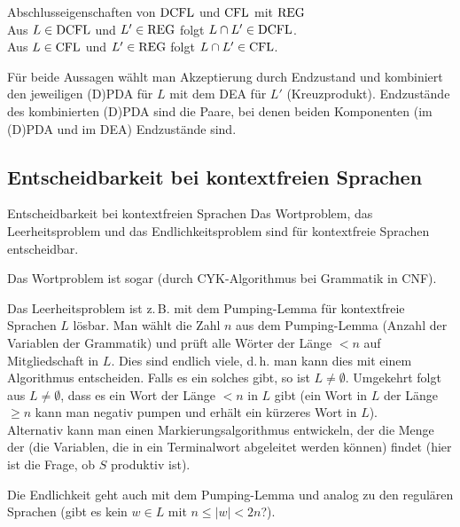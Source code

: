 \linie

\begin{Satz}{Abschlusseigenschaften von $\text{DCFL}$ und $\text{CFL}$ mit $\text{REG}$}\\
    Aus $L \in \text{DCFL}$ und $L' \in \text{REG}$ folgt $L \cap L' \in \text{DCFL}$.\\
    Aus $L \in \text{CFL}$ und $L' \in \text{REG}$ folgt $L \cap L' \in \text{CFL}$.
\end{Satz}

\begin{Beweis}
    Für beide Aussagen wählt man Akzeptierung durch Endzustand und kombiniert
    den jeweiligen (D)PDA für $L$ mit dem DEA für $L'$ (Kreuzprodukt).
    Endzustände des kombinierten (D)PDA sind die Paare, bei denen beiden
    Komponenten (im (D)PDA und im DEA) Endzustände sind.
\end{Beweis}

\pagebreak

\subsection{%
    Entscheidbarkeit bei kontextfreien Sprachen%
}

\begin{Satz}{Entscheidbarkeit bei kontextfreien Sprachen}
    Das Wortproblem, das Leerheitsproblem und das Endlichkeitsproblem sind
    für kontextfreie Sprachen entscheidbar.
\end{Satz}

\begin{Beweis}
    Das Wortproblem ist sogar 
    (durch CYK-Algorithmus bei Grammatik in CNF).

    Das Leerheitsproblem ist z.\,B. mit dem Pumping-Lemma für kontextfreie
    Sprachen $L$ lösbar.
    Man wählt die Zahl $n$ aus dem Pumping-Lemma
    (Anzahl der Variablen der Grammatik) und prüft alle Wörter der Länge $< n$
    auf Mitgliedschaft in $L$.
    Dies sind endlich viele, d.\,h. man kann dies mit einem Algorithmus
    entscheiden.
    Falls es ein solches gibt, so ist $L \not= \emptyset$.
    Umgekehrt folgt aus $L \not= \emptyset$, dass es ein Wort der Länge $< n$
    in $L$ gibt
    (ein Wort in $L$ der Länge $\ge n$ kann man negativ pumpen und erhält ein
    kürzeres Wort in $L$).\\
    Alternativ kann man einen Markierungsalgorithmus entwickeln, der die
    Menge der 
    (die Variablen, die in ein Terminalwort abgeleitet werden können)
    findet (hier ist die Frage, ob $S$ produktiv ist).

    Die Endlichkeit geht auch mit dem Pumping-Lemma und analog zu den regulären
    Sprachen (gibt es kein $w \in L$ mit $n \le |w| < 2n$?).
\end{Beweis}

